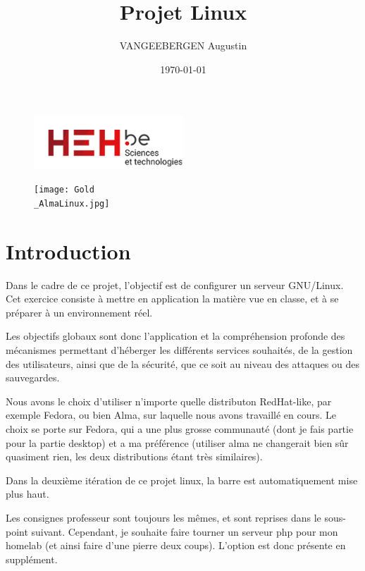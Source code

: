 \documentclass{article}
\title{Projet Linux}
\author{VANGEEBERGEN Augustin}
\date{\today}
\begin{document}
	
	\maketitle
	
	\begin{figure}[h]
		\centering
		\includegraphics[width=0.5\textwidth]{logo.png}
		\label{fig:logoheh}
	\end{figure}
	
	\begin{figure}[h!]
		\centering
		\texttt{[image: Gold\\\_AlmaLinux.jpg]}	
		\label{fig:logoheh}
	\end{figure}
	
	\newpage


	\tableofcontents
	\newpage
	

	
\section{Introduction}
Dans le cadre de ce projet, l'objectif est de configurer un serveur GNU/Linux. Cet exercice consiste à mettre en application la matière vue en classe, et à se préparer à un environnement réel.
	
Les objectifs globaux sont donc l'application et la compréhension profonde des mécanismes permettant d'héberger les différents services souhaités, de la gestion des utilisateurs, ainsi que de la sécurité, que ce soit au niveau des attaques ou des sauvegardes.

Nous avons le choix d'utiliser n'importe quelle distributon RedHat-like, par exemple Fedora, ou bien Alma, sur laquelle nous avons travaillé en cours.
Le choix se porte sur Fedora, qui a une plus grosse communauté (dont je fais partie pour la partie desktop) et a ma préférence (utiliser alma ne changerait bien sûr quasiment rien, les deux distributions étant très similaires).

Dans la deuxième itération de ce projet linux, la barre est automatiquement mise plus haut.
	
Les consignes professeur sont toujours les mêmes, et sont reprises dans le sous-point suivant. Cependant, je souhaite faire tourner un serveur php pour mon homelab (et ainsi faire d'une pierre deux coups). L'option est donc présente en supplément.
	
\end{document}
